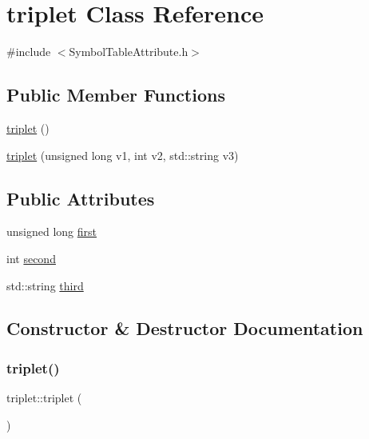 \hypertarget{classtriplet}{}\section{triplet Class Reference}
\label{classtriplet}


{\ttfamily \#include $<$Symbol\+Table\+Attribute.\+h$>$}

\subsection*{Public Member Functions}
\begin{DoxyCompactItemize}
\item 
\hyperlink{classtriplet_a01cfe4002bbd14a8eaa841697bc3a336}{triplet} ()
\item 
\hyperlink{classtriplet_ab2d03159a2e99fee8d621dddec481d66}{triplet} (unsigned long v1, int v2, std\+::string v3)
\end{DoxyCompactItemize}
\subsection*{Public Attributes}
\begin{DoxyCompactItemize}
\item 
unsigned long \hyperlink{classtriplet_a3af8f9c37ea8230ec41a2e576f31cacd}{first}
\item 
int \hyperlink{classtriplet_ae2f96f25885f90f2668d142b31e9dac4}{second}
\item 
std\+::string \hyperlink{classtriplet_ab4d72eb35d165043734c7e870c01677f}{third}
\end{DoxyCompactItemize}


\subsection{Constructor \& Destructor Documentation}
\mbox{\label{classtriplet_a01cfe4002bbd14a8eaa841697bc3a336}} 
\subsubsection{\texorpdfstring{triplet()}{triplet()}\hspace{0.1cm}{\footnotesize\ttfamily [1/2]}}
{\footnotesize\ttfamily triplet\+::triplet (\begin{DoxyParamCaption}{ }\end{DoxyParamCaption})\hspace{0.3cm}{\ttfamily [inline]}}

